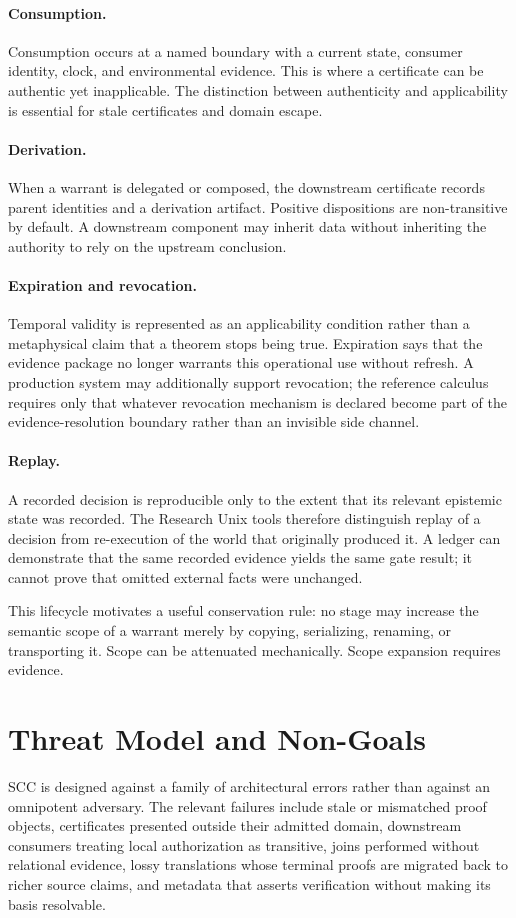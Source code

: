 \documentclass[11pt]{article}
\begin{document}
\paragraph{Consumption.} Consumption occurs at a named boundary with a current state, consumer identity, clock, and environmental evidence. This is where a certificate can be authentic yet inapplicable. The distinction between authenticity and applicability is essential for stale certificates and domain escape.

\paragraph{Derivation.} When a warrant is delegated or composed, the downstream certificate records parent identities and a derivation artifact. Positive dispositions are non-transitive by default. A downstream component may inherit data without inheriting the authority to rely on the upstream conclusion.

\paragraph{Expiration and revocation.} Temporal validity is represented as an applicability condition rather than a metaphysical claim that a theorem stops being true. Expiration says that the evidence package no longer warrants this operational use without refresh. A production system may additionally support revocation; the reference calculus requires only that whatever revocation mechanism is declared become part of the evidence-resolution boundary rather than an invisible side channel.

\paragraph{Replay.} A recorded decision is reproducible only to the extent that its relevant epistemic state was recorded. The Research Unix tools therefore distinguish replay of a decision from re-execution of the world that originally produced it. A ledger can demonstrate that the same recorded evidence yields the same gate result; it cannot prove that omitted external facts were unchanged.

This lifecycle motivates a useful conservation rule: no stage may increase the semantic scope of a warrant merely by copying, serializing, renaming, or transporting it. Scope can be attenuated mechanically. Scope expansion requires evidence.

\section{Threat Model and Non-Goals}
SCC is designed against a family of architectural errors rather than against an omnipotent adversary. The relevant failures include stale or mismatched proof objects, certificates presented outside their admitted domain, downstream consumers treating local authorization as transitive, joins performed without relational evidence, lossy translations whose terminal proofs are migrated back to richer source claims, and metadata that asserts verification without making its basis resolvable.
\end{document}
